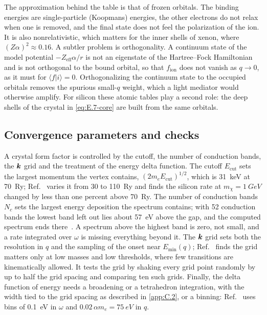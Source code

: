 The approximation behind the table is that of frozen orbitals. The binding energies are single-particle (Koopmans) energies, the other electrons do not relax when one is removed, and the final state does not feel the polarization of the ion. It is also nonrelativistic, which matters for the inner shells of xenon, where $(Z\alpha)^2 \approx 0.16$. A subtler problem is orthogonality. A continuum state of the model potential $-Z_{\mathrm{eff}}\alpha/r$ is not an eigenstate of the Hartree--Fock Hamiltonian and is not orthogonal to the bound orbital, so that $f_{\mathrm{ion}}$ does not vanish as $q \to 0$, as it must for $\langle f|i\rangle = 0$. Orthogonalizing the continuum state to the occupied orbitals removes the spurious small-$q$ weight, which a light mediator would otherwise amplify. For silicon these atomic tables play a second role: the deep shells of the crystal in \cref{eq:E.7-core} are built from the same orbitals.

\subsection{Convergence parameters and checks}

A crystal form factor is controlled by the cutoff, the number of conduction bands, the $\bm{k}$ grid and the treatment of the energy delta function. The cutoff $E_{\mathrm{cut}}$ sets the largest momentum the vertex contains, $(2m_eE_{\mathrm{cut}})^{1/2}$, which is \SI{31}{keV} at \SI{70}{Ry}; Ref.~\cite[Appendix~C]{essig2016direct} varies it from 30 to \SI{110}{Ry} and finds the silicon rate at $m_\chi = \SI{1}{GeV}$ changed by less than one percent above \SI{70}{Ry}. The number of conduction bands $N_c$ sets the largest energy deposition the spectrum contains; with 52 conduction bands the lowest band left out lies about \SI{57}{eV} above the gap, and the computed spectrum ends there~\cite[Sect.~4.2]{essig2016direct}. A spectrum above the highest band is zero, not small, and a rate integrated over $\omega$ is missing everything beyond it. The $\bm{k}$ grid sets both the resolution in $q$ and the sampling of the onset near $E_{\mathrm{min}}(q)$; Ref.~\cite[Appendix~C]{essig2016direct} finds the grid matters only at low masses and low thresholds, where few transitions are kinematically allowed. It tests the grid by shaking every grid point randomly by up to half the grid spacing and comparing ten such grids. Finally, the delta function of energy needs a broadening or a tetrahedron integration, with the width tied to the grid spacing as described in \cref{app:C.2}, or a binning: Ref.~\cite[Sect.~4.2]{essig2016direct} uses bins of \SI{0.1}{eV} in $\omega$ and $0.02\,\alpha m_e = \SI{75}{eV}$ in $q$.

